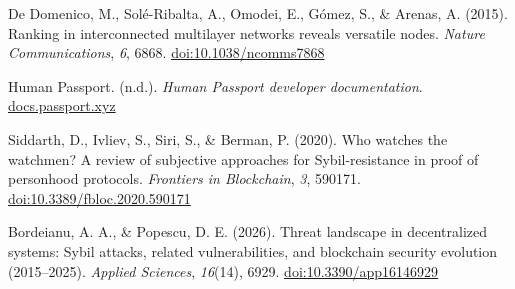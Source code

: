 \begin{enumerate}[label={[\arabic*]}, leftmargin=*, itemsep=0.35em, parsep=0pt]
  \item{}\label{ref:63} De Domenico, M., Sol\'{e}-Ribalta, A., Omodei, E., G\'{o}mez, S., \& Arenas, A. (2015). Ranking in interconnected multilayer networks reveals versatile nodes. \textit{Nature Communications}, \textit{6}, 6868. \href{https://doi.org/10.1038/ncomms7868}{doi:10.1038/ncomms7868}
  \item{}\label{ref:64} Human Passport. (n.d.). \textit{Human Passport developer documentation}. \href{https://docs.passport.xyz/}{docs.passport.xyz}
  \item{}\label{ref:65} Siddarth, D., Ivliev, S., Siri, S., \& Berman, P. (2020). Who watches the watchmen? A review of subjective approaches for Sybil-resistance in proof of personhood protocols. \textit{Frontiers in Blockchain}, \textit{3}, 590171. \href{https://doi.org/10.3389/fbloc.2020.590171}{doi:10.3389/fbloc.2020.590171}
  \item{}\label{ref:66} Bordeianu, A. A., \& Popescu, D. E. (2026). Threat landscape in decentralized systems: Sybil attacks, related vulnerabilities, and blockchain security evolution (2015--2025). \textit{Applied Sciences}, \textit{16}(14), 6929. \href{https://doi.org/10.3390/app16146929}{doi:10.3390/app16146929}
\end{enumerate}
\endgroup

